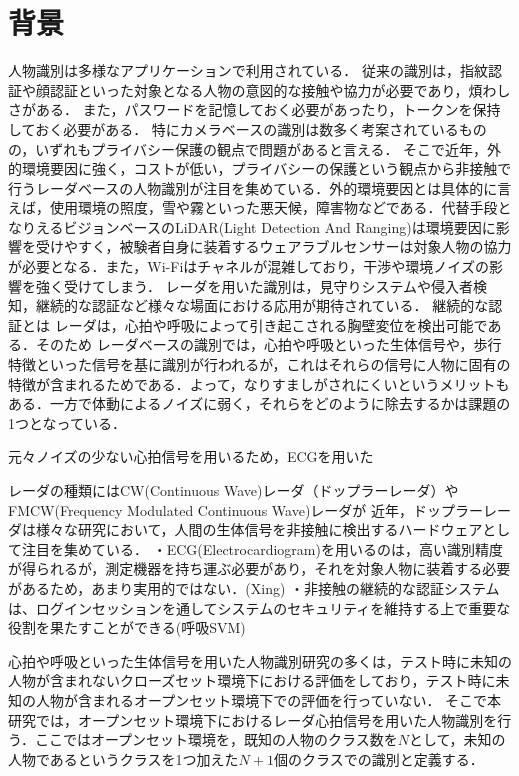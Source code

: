 \section{背景}
人物識別は多様なアプリケーションで利用されている．
従来の識別は，指紋認証や顔認証といった対象となる人物の意図的な接触や協力が必要であり，煩わしさがある．
また，パスワードを記憶しておく必要があったり，トークンを保持しておく必要がある\cite{paper:password}．
特にカメラベースの識別は数多く考案されているものの，いずれもプライバシー保護の観点で問題があると言える．
そこで近年，外的環境要因に強く，コストが低い，プライバシーの保護という観点から非接触で行うレーダベースの人物識別が注目を集めている．外的環境要因とは具体的に言えば，使用環境の照度，雪や霧といった悪天候，障害物などである．代替手段となりえるビジョンベースのLiDAR(Light Detection And Ranging)は環境要因に影響を受けやすく，被験者自身に装着するウェアラブルセンサーは対象人物の協力が必要となる\cite{paper:unsupervised}．また，Wi-Fiはチャネルが混雑しており，干渉や環境ノイズの影響を強く受けてしまう．
レーダを用いた識別は，見守りシステムや侵入者検知，継続的な認証など様々な場面における応用が期待されている\cite{paper:Wireless_survey}．
継続的な認証とは
レーダは，心拍や呼吸によって引き起こされる胸壁変位を検出可能である\cite{paper:Wireless_survey}．そのため
レーダベースの識別では，心拍や呼吸といった生体信号や，歩行特徴といった信号を基に識別が行われるが，これはそれらの信号に人物に固有の特徴が含まれるためである．よって，なりすましがされにくいというメリットもある\cite{paper:HeartSignature}．一方で体動によるノイズに弱く，それらをどのように除去するかは課題の1つとなっている．

元々ノイズの少ない心拍信号を用いるため，ECGを用いた

レーダの種類にはCW(Continuous Wave)レーダ（ドップラーレーダ）やFMCW(Frequency Modulated Continuous Wave)レーダが
近年，ドップラーレーダは様々な研究において，人間の生体信号を非接触に検出するハードウェアとして注目を集めている．
・ECG(Electrocardiogram)を用いるのは，高い識別精度が得られるが，測定機器を持ち運ぶ必要があり，それを対象人物に装着する必要があるため，あまり実用的ではない．(Xing)
・非接触の継続的な認証システムは、ログインセッションを通してシステムのセキュリティを維持する上で重要な役割を果たすことができる(呼吸SVM)

心拍や呼吸といった生体信号を用いた人物識別研究の多くは，テスト時に未知の人物が含まれないクローズセット環境下における評価をしており，テスト時に未知の人物が含まれるオープンセット環境下での評価を行っていない．
そこで本研究では，オープンセット環境下におけるレーダ心拍信号を用いた人物識別を行う．ここではオープンセット環境を，既知の人物のクラス数を$N$として，未知の人物であるというクラスを1つ加えた$N+1$個のクラスでの識別と定義する．

